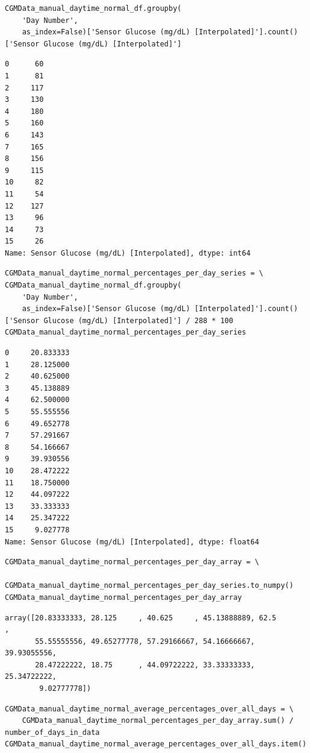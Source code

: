 \bigskip

\begin{verbatim}
CGMData_manual_daytime_normal_df.groupby(
    'Day Number', 
    as_index=False)['Sensor Glucose (mg/dL) [Interpolated]'].count()['Sensor Glucose (mg/dL) [Interpolated]']
\end{verbatim}

\begin{verbatim}
0      60
1      81
2     117
3     130
4     180
5     160
6     143
7     165
8     156
9     115
10     82
11     54
12    127
13     96
14     73
15     26
Name: Sensor Glucose (mg/dL) [Interpolated], dtype: int64
\end{verbatim}

\begin{verbatim}
CGMData_manual_daytime_normal_percentages_per_day_series = \
CGMData_manual_daytime_normal_df.groupby(
    'Day Number', 
    as_index=False)['Sensor Glucose (mg/dL) [Interpolated]'].count()['Sensor Glucose (mg/dL) [Interpolated]'] / 288 * 100
CGMData_manual_daytime_normal_percentages_per_day_series
\end{verbatim}

\begin{verbatim}
0     20.833333
1     28.125000
2     40.625000
3     45.138889
4     62.500000
5     55.555556
6     49.652778
7     57.291667
8     54.166667
9     39.930556
10    28.472222
11    18.750000
12    44.097222
13    33.333333
14    25.347222
15     9.027778
Name: Sensor Glucose (mg/dL) [Interpolated], dtype: float64
\end{verbatim}

\begin{verbatim}
CGMData_manual_daytime_normal_percentages_per_day_array = \
    CGMData_manual_daytime_normal_percentages_per_day_series.to_numpy()
CGMData_manual_daytime_normal_percentages_per_day_array
\end{verbatim}

\begin{verbatim}
array([20.83333333, 28.125     , 40.625     , 45.13888889, 62.5       ,
       55.55555556, 49.65277778, 57.29166667, 54.16666667, 39.93055556,
       28.47222222, 18.75      , 44.09722222, 33.33333333, 25.34722222,
        9.02777778])
\end{verbatim}

\begin{verbatim}
CGMData_manual_daytime_normal_average_percentages_over_all_days = \
    CGMData_manual_daytime_normal_percentages_per_day_array.sum() / number_of_days_in_data
CGMData_manual_daytime_normal_average_percentages_over_all_days.item()
\end{verbatim}

